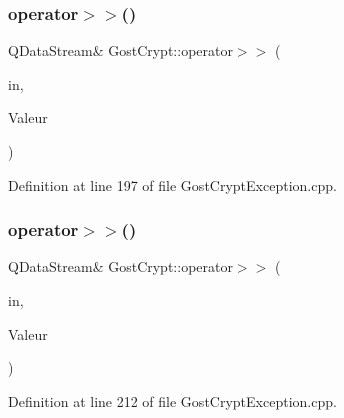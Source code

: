 \subsubsection{\texorpdfstring{operator$>$$>$()}{operator>>()}\hspace{0.1cm}{\footnotesize\ttfamily [12/13]}}
{\footnotesize\ttfamily Q\+Data\+Stream\& Gost\+Crypt\+::operator$>$$>$ (\begin{DoxyParamCaption}\item[{Q\+Data\+Stream \&}]{in,  }\item[{\hyperlink{class_gost_crypt_1_1_external_exception}{Gost\+Crypt\+::\+External\+Exception} \&}]{Valeur }\end{DoxyParamCaption})}



Definition at line 197 of file Gost\+Crypt\+Exception.\+cpp.

\mbox{\label{namespace_gost_crypt_ae971f90c2d4d1980125c87f71e1fb45b}} 
\subsubsection{\texorpdfstring{operator$>$$>$()}{operator>>()}\hspace{0.1cm}{\footnotesize\ttfamily [13/13]}}
{\footnotesize\ttfamily Q\+Data\+Stream\& Gost\+Crypt\+::operator$>$$>$ (\begin{DoxyParamCaption}\item[{Q\+Data\+Stream \&}]{in,  }\item[{\hyperlink{class_gost_crypt_1_1_invalid_parameter}{Gost\+Crypt\+::\+Invalid\+Parameter} \&}]{Valeur }\end{DoxyParamCaption})}



Definition at line 212 of file Gost\+Crypt\+Exception.\+cpp.

